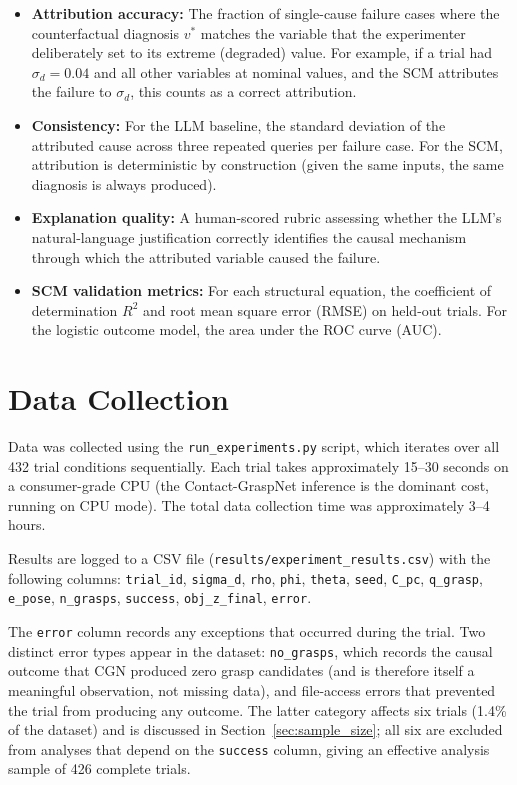 \documentclass[11pt,a4paper]{report}
\begin{document}
\begin{itemize}
  \item \textbf{Attribution accuracy:} The fraction of single-cause failure cases where the counterfactual diagnosis $v^*$ matches the variable that the experimenter deliberately set to its extreme (degraded) value. For example, if a trial had $\sigma_d = 0.04$ and all other variables at nominal values, and the SCM attributes the failure to $\sigma_d$, this counts as a correct attribution.

  \item \textbf{Consistency:} For the LLM baseline, the standard deviation of the attributed cause across three repeated queries per failure case. For the SCM, attribution is deterministic by construction (given the same inputs, the same diagnosis is always produced).

  \item \textbf{Explanation quality:} A human-scored rubric assessing whether the LLM's natural-language justification correctly identifies the causal mechanism through which the attributed variable caused the failure.

  \item \textbf{SCM validation metrics:} For each structural equation, the coefficient of determination $R^2$ and root mean square error (RMSE) on held-out trials. For the logistic outcome model, the area under the ROC curve (AUC).
\end{itemize}

\section{Data Collection}
\label{sec:data_collection}

Data was collected using the \texttt{run\_experiments.py} script, which iterates over all 432 trial conditions sequentially. Each trial takes approximately 15--30 seconds on a consumer-grade CPU (the Contact-GraspNet inference is the dominant cost, running on CPU mode). The total data collection time was approximately 3--4 hours.

Results are logged to a CSV file (\texttt{results/experiment\_results.csv}) with the following columns: \texttt{trial\_id}, \texttt{sigma\_d}, \texttt{rho}, \texttt{phi}, \texttt{theta}, \texttt{seed}, \texttt{C\_pc}, \texttt{q\_grasp}, \texttt{e\_pose}, \texttt{n\_grasps}, \texttt{success}, \texttt{obj\_z\_final}, \texttt{error}.

The \texttt{error} column records any exceptions that occurred during the trial. Two distinct error types appear in the dataset: \texttt{no\_grasps}, which records the causal outcome that CGN produced zero grasp candidates (and is therefore itself a meaningful observation, not missing data), and file-access errors that prevented the trial from producing any outcome. The latter category affects six trials (1.4\% of the dataset) and is discussed in Section~\ref{sec:sample_size}; all six are excluded from analyses that depend on the \texttt{success} column, giving an effective analysis sample of 426 complete trials.
\end{document}
